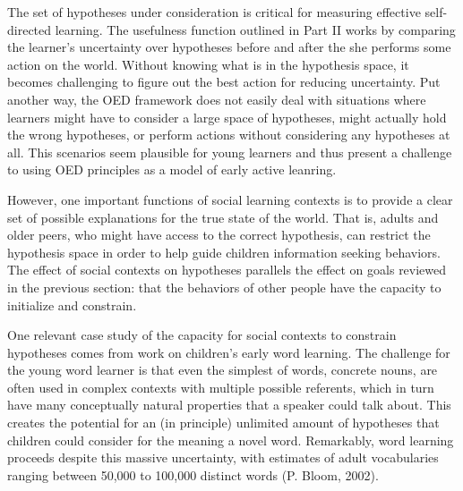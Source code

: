 \documentclass[english,man]{apa6}
\theoremstyle{definition}
\theoremstyle{definition}
\theoremstyle{definition}
\theoremstyle{remark}
\begin{document}
The set of hypotheses under consideration is critical for measuring
effective self-directed learning. The usefulness function outlined in
Part II works by comparing the learner's uncertainty over hypotheses
before and after the she performs some action on the world. Without
knowing what is in the hypothesis space, it becomes challenging to
figure out the best action for reducing uncertainty. Put another way,
the OED framework does not easily deal with situations where learners
might have to consider a large space of hypotheses, might actually hold
the wrong hypotheses, or perform actions without considering any
hypotheses at all. This scenarios seem plausible for young learners and
thus present a challenge to using OED principles as a model of early
active leanring.

However, one important functions of social learning contexts is to
provide a clear set of possible explanations for the true state of the
world. That is, adults and older peers, who might have access to the
correct hypothesis, can restrict the hypothesis space in order to help
guide children information seeking behaviors. The effect of social
contexts on hypotheses parallels the effect on goals reviewed in the
previous section: that the behaviors of other people have the capacity
to initialize and constrain.

One relevant case study of the capacity for social contexts to constrain
hypotheses comes from work on children's early word learning. The
challenge for the young word learner is that even the simplest of words,
concrete nouns, are often used in complex contexts with multiple
possible referents, which in turn have many conceptually natural
properties that a speaker could talk about. This creates the potential
for an (in principle) unlimited amount of hypotheses that children could
consider for the meaning a novel word. Remarkably, word learning
proceeds despite this massive uncertainty, with estimates of adult
vocabularies ranging between 50,000 to 100,000 distinct words (P. Bloom,
2002).
\end{document}
